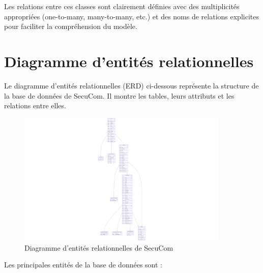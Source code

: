 \documentclass[12pt,a4paper]{report}
\begin{document}
Les relations entre ces classes sont clairement définies avec des multiplicités appropriées (one-to-many, many-to-many, etc.) et des noms de relations explicites pour faciliter la compréhension du modèle.

\section{Diagramme d'entités relationnelles}

Le diagramme d'entités relationnelles (ERD) ci-dessous représente la structure de la base de données de SecuCom. Il montre les tables, leurs attributs et les relations entre elles.

\begin{figure}[h]
\centering
\includegraphics[width=0.9\textwidth]{ERD.png}
\caption{Diagramme d'entités relationnelles de SecuCom}
\end{figure}

Les principales entités de la base de données sont :
\end{document}

